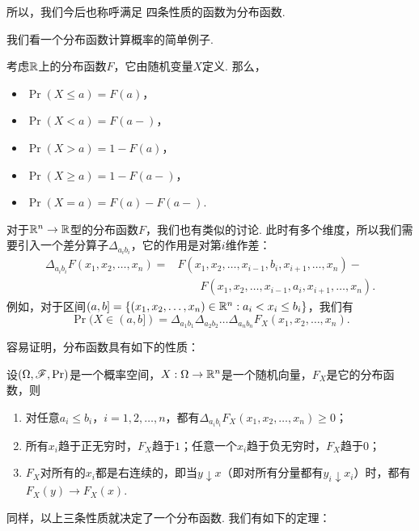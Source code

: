所以，我们今后也称呼满足 四条性质的函数为分布函数. 

我们看一个分布函数计算概率的简单例子. 
\begin{example}\label{example:distribution-prob}
    考虑$\mathbb{R}$上的分布函数$F$，它由随机变量$X$定义. 那么，
    \begin{itemize}
        \item $\Pr(X\leq a)=F(a)$，
        \item $\Pr(X<a)=F(a-)$，
        \item $\Pr(X>a)=1-F(a)$，
        \item $\Pr(X\geq a)=1-F(a-)$，
        \item $\Pr(X=a)=F(a)-F(a-)$. 
    \end{itemize}
    \end{example}

对于$\mathbb{R}^n\to\mathbb{R}$型的分布函数$F$，我们也有类似的讨论. 此时有多个维度，所以我们需要引入一个差分算子$\Delta_{a_ib_i}$，它的作用是对第$i$维作差：
\begin{align*}
    \Delta_{a_ib_i}F(x_1,x_2,\ldots,x_n)=&F(x_1,x_2,\ldots,x_{i-1},b_i,x_{i+1},\ldots,x_n)-\\
    &\qquad F(x_1,x_2,\ldots,x_{i-1},a_i,x_{i+1},\ldots,x_n).
\end{align*}
例如，对于区间$(a,b]=\{(x_1,x_2,\ldots,x_n)\in\mathbb{R}^n:a_i<x_i\leq b_i\}$，我们有
\[
    \Pr(X\in(a,b]) = \Delta_{a_1b_1}\Delta_{a_2b_2}\dots\Delta_{a_nb_n}F_X(x_1,x_2,\ldots,x_n).
\]

容易证明，分布函数具有如下的性质：

\begin{proposition}\label{proposition:distribution-function-n}
设$(\Omega,\mathscr{F},\Pr)$是一个概率空间，$X:\Omega\to\mathbb{R}^n$是一个随机向量，$F_X$是它的分布函数，则
\begin{enumerate}
    \item 对任意$a_i\leq b_i$，$i=1,2,\ldots,n$，都有$\Delta_{a_ib_i}F_X(x_1,x_2,\ldots,x_n)\geq 0$；
    \item 所有$x_i$趋于正无穷时，$F_X$趋于$1$；任意一个$x_i$趋于负无穷时，$F_X$趋于$0$；
    \item $F_X$对所有的$x_i$都是右连续的，即当$y\downarrow x$（即对所有分量都有$y_i\downarrow x_i$）时，都有$F_X(y)\to F_X(x)$.
\end{enumerate}
\end{proposition}

同样，以上三条性质就决定了一个分布函数. 我们有如下的定理：

